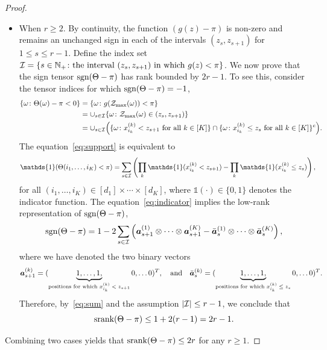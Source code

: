\documentclass[11pt]{article}
\theoremstyle{plain}
\theoremstyle{definition}
\newcommand*{\KeepStyleUnderBrace}[1]{%
  \mathop{%
    \mathchoice
    {\underbrace{\displaystyle#1}}%
    {\underbrace{\textstyle#1}}%
    {\underbrace{\scriptstyle#1}}%
    {\underbrace{\scriptscriptstyle#1}}%
  }\limits
}
\def\sign{\textup{sgn}}
\def\srank{\textup{srank}}
\begin{document}
\begin{proof}
\begin{itemize}[leftmargin=*,topsep=0pt,itemsep=-1ex,partopsep=1ex,parsep=1ex]
\item When $r\geq 2$.   By continuity, the function $(g(z)-\pi)$ is non-zero and remains an unchanged sign in each of the intervals $(z_s, z_{s+1})$ for $1\leq s\leq r-1$. Define the index set $\mathcal{I}=\{s\in\mathbb{N}_{+}\colon \text{the interval $(z_s, z_{s+1})$ in which $g(z)<\pi$}\}$. 
We now prove that the sign tensor $\sign(\Theta-\pi)$ has rank bounded by $2r-1$. To see this, consider the tensor indices for which $\sign(\Theta-\pi)=-1$,
\begin{align}\label{eq:support}
\{\omega\colon \Theta(\omega)-\pi <0 \} & = \{\omega \colon g(\mathcal{Z}_{\max}(\omega))<\pi\} \notag \\
&=\cup_{s\in \mathcal{I}} \{\omega\colon \mathcal{Z}_{\max}(\omega)\in(z_s,z_{s+1})\}\notag\\
&=\cup_{s\in \mathcal{I}}\Big( \{\omega\colon \text{$x^{(k)}_{i_k}< z_{s+1}$ for all $k\in[K]$}\}\cap \{\omega\colon \text{$x^{(k)}_{i_k}\leq z_{s}$ for all $k\in[K]$}\}^c\Big).
\end{align}
The equation~\eqref{eq:support} is equivalent to 
\begin{align}\label{eq:indicator}
\mathds{1}(\Theta(i_1,\ldots,i_K)< \pi)&
=\sum_{s\in \tI}\left( \prod_k \mathds{1}(x^{(k)}_{i_k}< z_{s+1}) - \prod_k \mathds{1}(x^{(k)}_{i_k}\leq z_{s})\right),
\end{align}
for all $(i_1,\ldots,i_K)\in[d_1]\times \cdots\times[d_K]$, where $\mathds{1}(\cdot)\in\{0,1\}$ denotes the indicator function. The equation~\eqref{eq:indicator} implies the low-rank representation of $\sign(\Theta-\pi)$,
\begin{equation}\label{eq:sum}
\sign(\Theta-\pi)=1-2\sum_{s\in \tI } \left(\ma^{(1)}_{s+1}\otimes\cdots\otimes \ma^{(K)}_{s+1} - \bar \ma^{(1)}_s\otimes\cdots\otimes \bar \ma^{(K)}_s\right),
\end{equation}
where we have denoted the two binary vectors 
\[
\ma^{(k)}_{s+1}=(\KeepStyleUnderBrace{1,\ldots,1,}_{\text{positions for which $x_{i_k}^{(k)}<z_{s+1}$}}0,\ldots 0)^T,\quad \text{and}\quad
\bar \ma^{(k)}_s=(\KeepStyleUnderBrace{1,\ldots,1,}_{\text{positions for which $x_{i_k}^{(k)}\leq z_{s}$}}0,\ldots 0)^T.
\]
Therefore, by~\eqref{eq:sum} and the assumption $|\mathcal{I}|\leq r-1$, we conclude that 
\[
\srank(\Theta-\pi)\leq 1+2(r-1)=2r-1.
\]
\end{itemize}
Combining two cases yields that $\srank(\Theta-\pi)\leq 2r$ for any $r\geq 1$.
\end{proof}
\end{document}
